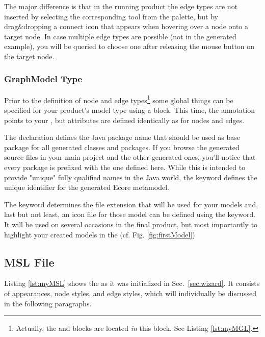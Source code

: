 \documentclass[a4paper,american,12pt]{scrreprt}
\begin{document}
The major difference is that in the running \cinco product the edge types are
not inserted by selecting the corresponding tool from the palette, but by
drag\&dropping a connect icon that appears when hovering over a node onto a
target node. In case multiple edge types are possible (not in the generated
example), you will be queried to choose one after releasing the mouse button on
the target node.

\subsubsection{GraphModel Type}

Prior to the definition of node and edge types\footnote{Actually, the 
and  blocks are located \emph{in} this  block. See
Listing \ref{lst:myMGL}.} some global things can be specified for your \cinco
product's model type using a   block.  This time,
the  annotation points to your , but
attributes are defined identically as for nodes and edges.

The  declaration defines the Java package name that should be used
as base package for all generated classes and packages. If you browse the
generated source files in your main project and the other generated ones, you'll
notice that every package is prefixed with the one defined here. While this is
intended to provide "unique" fully qualified names in the Java world, the
 keyword defines the unique identifier for the generated Ecore
metamodel.

The  keyword determines the file extension that will be
used for your models and, last but not least, an icon file for those model can
be defined using the  keyword. It will be used on several occasions
in the final product, but most importantly to highlight your created models in
the  (cf. Fig. \ref{fig:firstModel}) 

\subsection{MSL File} \label{sec:msl}


Listing \ref{lst:myMSL} shows the  as it was initialized
in Sec.~\ref{sec:wizard}. It consists of appearances, node styles, and
edge styles, which will individually be discussed in the following paragraphs.
\end{document}
